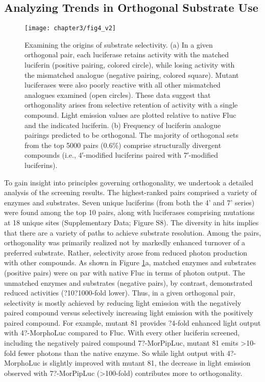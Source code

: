 \subsection*{Analyzing Trends in Orthogonal Substrate Use}
\begin{figure}[htbp]
\texttt{[image: chapter3/fig4\_v2]}
\centering
\caption[Examining the origins of substrate selectivity]{Examining the origins of substrate selectivity. (a) In a given orthogonal pair, each luciferase retains activity with the matched luciferin (positive pairing, colored circle), while losing activity with the mismatched analogue (negative pairing, colored square). Mutant luciferases were also poorly reactive with all other mismatched analogues examined (open circles). These data suggest that orthogonality arises from selective retention of activity with a single compound. Light emission values are plotted relative to native Fluc and the indicated luciferin. (b) Frequency of luciferin analogue pairings predicted to be orthogonal. The majority of orthogonal sets from the top 5000 pairs (0.6\%{}) comprise structurally divergent compounds (i.e., 4′-modified luciferins paired with 7′-modified luciferins).}
  \label{fig:heatmap}
\end{figure}
To gain insight into principles governing orthogonality, we undertook a detailed analysis of the screening results. The highest-ranked pairs comprised a variety of enzymes and substrates. Seven unique luciferins (from both the 4' and 7' series) were found among the top 10 pairs, along with luciferases comprising mutations at 18 unique sites (Supplementary Data; Figure S8). The diversity in hits implies that there are a variety of paths to achieve substrate resolution. Among the pairs, orthogonality was primarily realized not by markedly enhanced turnover of a preferred substrate. Rather, selectivity arose from reduced photon production with other compounds. As shown in Figure \ref{fig:heatmap}a, matched enzymes and substrates (positive pairs) were on par with native Fluc in terms of photon output. The unmatched enzymes and substrates (negative pairs), by contrast, demonstrated reduced activities (?10?1000-fold lower). Thus, in a given orthogonal pair, selectivity is mostly achieved by reducing light emission with the negatively paired compound versus selectively increasing light emission with the positively paired compound. For example, mutant 81 provides ?4-fold enhanced light output with 4?-MorphoLuc compared to Fluc. With every other luciferin screened, including the negatively paired compound 7?-MorPipLuc, mutant 81 emits >10-fold fewer photons than the native enzyme. So while light output with 4?-MorphoLuc is slightly improved with mutant 81, the decrease in light emission observed with 7?-MorPipLuc (>100-fold) contributes more to orthogonality.
